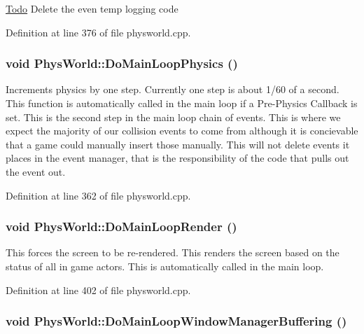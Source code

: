 \begin{Desc}
\item[\hyperlink{todo__todo000011}{Todo}]Delete the even temp logging code \end{Desc}


Definition at line 376 of file physworld.cpp.\hypertarget{classPhysWorld_a994d7d8c4a9a0c003c3e7d89be7b399b}{
\subsubsection[{DoMainLoopPhysics}]{\setlength{\rightskip}{0pt plus 5cm}void PhysWorld::DoMainLoopPhysics ()}}
\label{db/df5/classPhysWorld_a994d7d8c4a9a0c003c3e7d89be7b399b}


Increments physics by one step. Currently one step is about 1/60 of a second. This function is automatically called in the main loop if a Pre-\/Physics Callback is set. This is the second step in the main loop chain of events. This is where we expect the majority of our collision events to come from although it is concievable that a game could manually insert those manually. This will not delete events it places in the event manager, that is the responsibility of the code that pulls out the event out. 

Definition at line 362 of file physworld.cpp.\hypertarget{classPhysWorld_a8f33541d67164a2452e568443e9905be}{
\subsubsection[{DoMainLoopRender}]{\setlength{\rightskip}{0pt plus 5cm}void PhysWorld::DoMainLoopRender ()}}
\label{db/df5/classPhysWorld_a8f33541d67164a2452e568443e9905be}


This forces the screen to be re-\/rendered. This renders the screen based on the status of all in game actors. This is automatically called in the main loop. 

Definition at line 402 of file physworld.cpp.\hypertarget{classPhysWorld_ae81bab7f314d98f7b787c508e60c9c9a}{
\subsubsection[{DoMainLoopWindowManagerBuffering}]{\setlength{\rightskip}{0pt plus 5cm}void PhysWorld::DoMainLoopWindowManagerBuffering ()}}
\label{db/df5/classPhysWorld_ae81bab7f314d98f7b787c508e60c9c9a}


